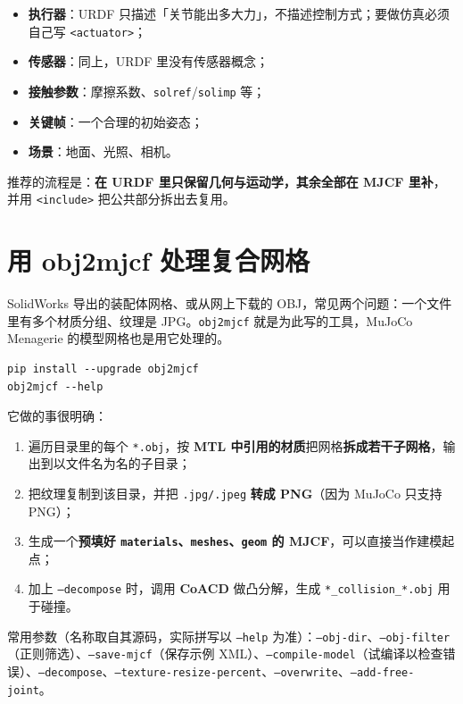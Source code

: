 \begin{itemize}
	\item \textbf{执行器}：URDF 只描述「关节能出多大力」，不描述控制方式；要做仿真必须自己写 \texttt{<actuator>}；
	\item \textbf{传感器}：同上，URDF 里没有传感器概念；
	\item \textbf{接触参数}：摩擦系数、\texttt{solref}/\texttt{solimp} 等；
	\item \textbf{关键帧}：一个合理的初始姿态；
	\item \textbf{场景}：地面、光照、相机。
\end{itemize}

推荐的流程是：\textbf{在 URDF 里只保留几何与运动学，其余全部在 MJCF 里补}，并用 \texttt{<include>} 把公共部分拆出去复用。

\section{用 obj2mjcf 处理复合网格}

SolidWorks 导出的装配体网格、或从网上下载的 OBJ，常见两个问题：一个文件里有多个材质分组、纹理是 JPG。\texttt{obj2mjcf} 就是为此写的工具，MuJoCo Menagerie 的模型网格也是用它处理的。

\begin{lstlisting}[style=shell]
pip install --upgrade obj2mjcf
obj2mjcf --help
\end{lstlisting}

它做的事很明确：

\begin{enumerate}
	\item 遍历目录里的每个 \texttt{*.obj}，按 \textbf{MTL 中引用的材质}把网格\textbf{拆成若干子网格}，输出到以文件名为名的子目录；
	\item 把纹理复制到该目录，并把 \texttt{.jpg/.jpeg} \textbf{转成 PNG}（因为 MuJoCo 只支持 PNG）；
	\item 生成一个\textbf{预填好 \texttt{materials}、\texttt{meshes}、\texttt{geom} 的 MJCF}，可以直接当作建模起点；
	\item 加上 \texttt{--decompose} 时，调用 \textbf{CoACD} 做凸分解，生成 \texttt{*\_collision\_*.obj} 用于碰撞。
\end{enumerate}

常用参数（名称取自其源码，实际拼写以 \texttt{--help} 为准）：\texttt{--obj-dir}、\texttt{--obj-filter}（正则筛选）、\texttt{--save-mjcf}（保存示例 XML）、\texttt{--compile-model}（试编译以检查错误）、\texttt{--decompose}、\texttt{--texture-resize-percent}、\texttt{--overwrite}、\texttt{--add-free-joint}。

